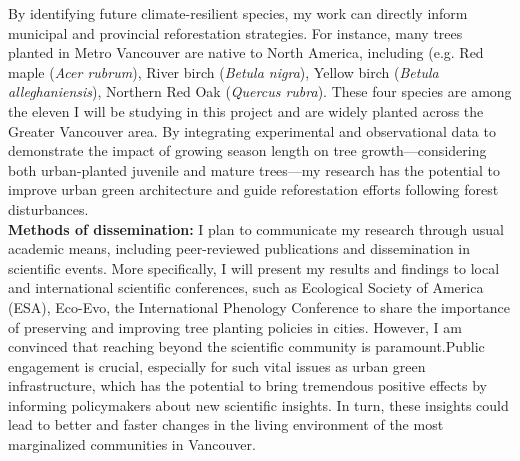 \documentclass[11pt,letter]{article}
\begin{document}
\par 
By identifying future climate-resilient species, my work can directly inform municipal and provincial reforestation strategies. For instance, many trees planted in Metro Vancouver are native to North America, including (e.g. Red maple (\textit{Acer rubrum}), River birch (\textit{Betula nigra}), Yellow birch (\textit{Betula alleghaniensis}), Northern Red Oak (\textit{Quercus rubra}). These four species are among the eleven I will be studying in this project and are widely planted across the Greater Vancouver area. By integrating experimental and observational data to demonstrate the impact of growing season length on tree growth—considering both urban-planted juvenile and mature trees—my research has the potential to improve urban green architecture and guide reforestation efforts following forest disturbances.\\
\textbf{Methods of dissemination:} I plan to communicate my research through usual academic means, including peer-reviewed publications and dissemination in scientific events. More specifically, I will present my results and findings to local and international scientific conferences, such as Ecological Society of America (ESA), Eco-Evo, the International Phenology Conference to share the importance of preserving and improving tree planting policies in cities. However, I am convinced that reaching beyond the scientific community is paramount.Public engagement is crucial, especially for such vital issues as urban green infrastructure, which has the potential to bring tremendous positive effects by informing policymakers about new scientific insights. In turn, these insights could lead to better and faster changes in the living environment of the most marginalized communities in Vancouver.
\end{document}
